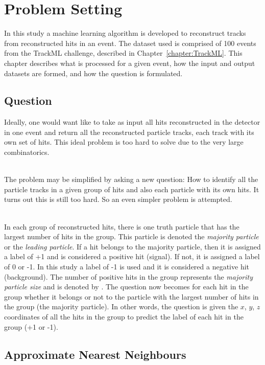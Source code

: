 \chapter{Problem Setting}
\label{chapter:ProblemSetting}

In this study a machine learning algorithm is developed to reconstruct tracks from reconstructed hits in an event. The dataset used is comprised of 100 events from the TrackML challenge, described in Chapter~\ref{chapter:TrackML}. This chapter describes what is processed for a given event, how the input and output datasets are formed, and how the question is formulated.

\section{Question}
\label{sec:Question}

Ideally, one would want like to take as input all hits reconstructed in the detector in one event and return all the reconstructed particle tracks, each track with its own set of hits. This ideal problem is too hard to solve due to the very large combinatorics. 

\ \\The problem may be simplified by asking a new question: How to identify all the particle tracks in a given group of hits and also each particle with its own hits. It turns out this is still too hard. So an even simpler problem is attempted. 

\ \\In each group of reconstructed hits, there is one truth particle that has the largest number of hits in the group. This particle is denoted the \emph{majority particle} or the \emph{leading particle}. If a hit belongs to the majority particle, then it is assigned a label of +1 and is considered a positive hit (signal). If not, it is assigned a label of 0 or -1. In this study a label of -1 is used and it is considered a negative hit (background). The number of positive hits in the group represents the \emph{majority particle size} and is denoted by \nbPositiveHit. The question now becomes for each hit in the group whether it belongs or not to the particle with the largest number of hits in the group (the majority particle). In other words, the question is given the $x$, $y$, $z$ coordinates of all the hits in the group to predict the label of each hit in the group (+1 or -1).

\section{Approximate Nearest Neighbours}
\label{sec:Approximate Nearest Neighbours}

